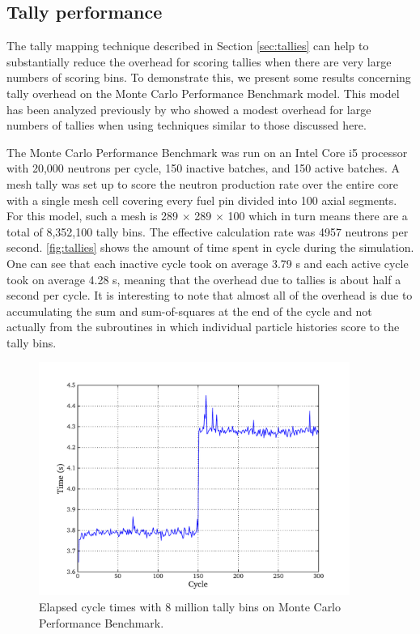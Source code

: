 \documentclass[authoryear,preprint]{elsarticle}
\begin{document}
\subsection{Tally performance}

The tally mapping technique described in Section \ref{sec:tallies} can help to
substantially reduce the overhead for scoring tallies when there are very large
numbers of scoring bins. To demonstrate this, we present some results concerning
tally overhead on the Monte Carlo Performance Benchmark model. This model has
been analyzed previously by \citet{mc21-physor} who showed a modest overhead for
large numbers of tallies when using techniques similar to those discussed here.

The Monte Carlo Performance Benchmark was run on an Intel Core i5 processor with
20,000 neutrons per cycle, 150 inactive batches, and 150 active batches. A mesh
tally was set up to score the neutron production rate over the entire core with
a single mesh cell covering every fuel pin divided into 100 axial segments. For
this model, such a mesh is 289 $\times$ 289 $\times$ 100 which in turn means
there are a total of 8,352,100 tally bins. The effective calculation rate was
4957 neutrons per second. \autoref{fig:tallies} shows the amount of time spent
in cycle during the simulation. One can see that each inactive cycle took on
average 3.79 s and each active cycle took on average 4.28 s, meaning
that the overhead due to tallies is about half a second per cycle. It is
interesting to note that almost all of the overhead is due to accumulating the
sum and sum-of-squares at the end of the cycle and not actually from the
subroutines in which individual particle histories score to the tally bins.

\begin{figure}[!ht]
  \centering
  \includegraphics[width=4in]{tallies.pdf}
  \caption{Elapsed cycle times with 8 million tally bins on Monte Carlo
    Performance Benchmark.}
  \label{fig:tallies}
\end{figure}
\end{document}
